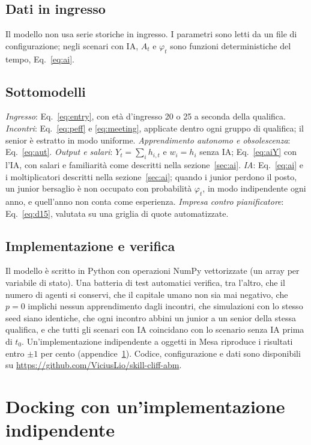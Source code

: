 \documentclass[preprint,12pt,authoryear]{elsarticle}
\begin{document}
\subsection{Dati in ingresso}
Il modello non usa serie storiche in ingresso. I parametri sono letti da un file di configurazione; negli scenari con IA, $A_t$ e $\varphi_t$ sono funzioni deterministiche del tempo, Eq.~\eqref{eq:ai}.

\subsection{Sottomodelli}
\emph{Ingresso}: Eq.~\eqref{eq:entry}, con età d'ingresso 20 o 25 a seconda della qualifica. \emph{Incontri}: Eq.~\eqref{eq:peff} e \eqref{eq:meeting}, applicate dentro ogni gruppo di qualifica; il senior è estratto in modo uniforme. \emph{Apprendimento autonomo e obsolescenza}: Eq.~\eqref{eq:aut}. \emph{Output e salari}: $Y_t=\sum_i h_{i,t}$ e $w_i=h_i$ senza IA; Eq.~\eqref{eq:aiY} con l'IA, con salari e familiarità come descritti nella sezione~\ref{sec:ai}. \emph{IA}: Eq.~\eqref{eq:ai} e i moltiplicatori descritti nella sezione~\ref{sec:ai}; quando i junior perdono il posto, un junior bersaglio è non occupato con probabilità $\varphi_t$, in modo indipendente ogni anno, e quell'anno non conta come esperienza. \emph{Impresa contro pianificatore}: Eq.~\eqref{eq:d15}, valutata su una griglia di quote automatizzate.

\subsection{Implementazione e verifica}
Il modello è scritto in Python con operazioni NumPy vettorizzate (un array per variabile di stato). Una batteria di test automatici verifica, tra l'altro, che il numero di agenti si conservi, che il capitale umano non sia mai negativo, che $p=0$ implichi nessun apprendimento dagli incontri, che simulazioni con lo stesso seed siano identiche, che ogni incontro abbini un junior a un senior della stessa qualifica, e che tutti gli scenari con IA coincidano con lo scenario senza IA prima di $t_0$. Un'implementazione indipendente a oggetti in Mesa riproduce i risultati entro $\pm1$ per cento (appendice~\ref{app:docking}). Codice, configurazione e dati sono disponibili su \url{https://github.com/ViciusLio/skill-cliff-abm}.

\section{Docking con un'implementazione indipendente}\label{app:docking}
\end{document}

